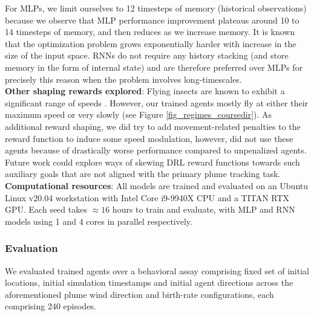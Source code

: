 \documentclass[5p,twocolumn,authoryear]{elsarticle}
\begin{document}
For MLPs, we limit ourselves to 12 timesteps of memory (historical observations) because we observe that MLP performance improvement plateaus around 10 to 14 timesteps of memory, and then reduces as we increase memory. It is known that the optimization problem grows exponentially harder with increase in the size of the input space. RNNs do not require any history stacking (and store memory in the form of internal state) and are therefore preferred over MLPs for precisely this reason when the problem involves long-timescales.
\\

\textbf{Other shaping rewards explored}: Flying insects are known to exhibit a significant range of speeds \citep{van2014plume}. 
However, our trained agents mostly fly at either their maximum speed or very slowly (see Figure \ref{fig_regimes_coursedir}).
As additional reward shaping, we did try to add movement-related penalties to the reward function to induce some speed modulation, however, did not use these agents because of drastically worse performance compared to unpenalized agents. 
Future work could explore ways of skewing DRL reward functions towards such auxiliary goals that are not aligned with the primary plume tracking task. \\

\textbf{Computational resources}: All models are trained and evaluated on an Ubuntu Linux v20.04 workstation with Intel Core i9-9940X CPU and a TITAN RTX GPU.
Each seed takes $\approx 16$ hours to train and evaluate, with MLP and RNN models using 1 and 4 cores in parallel respectively. \\



\subsubsection{Evaluation}
\label{sec_supp_eval}
We evaluated trained agents over a behavioral assay comprising fixed set of initial locations, initial simulation timestamps and initial agent directions across the aforementioned plume wind direction and birth-rate configurations, each comprising 240 episodes.
\end{document}
